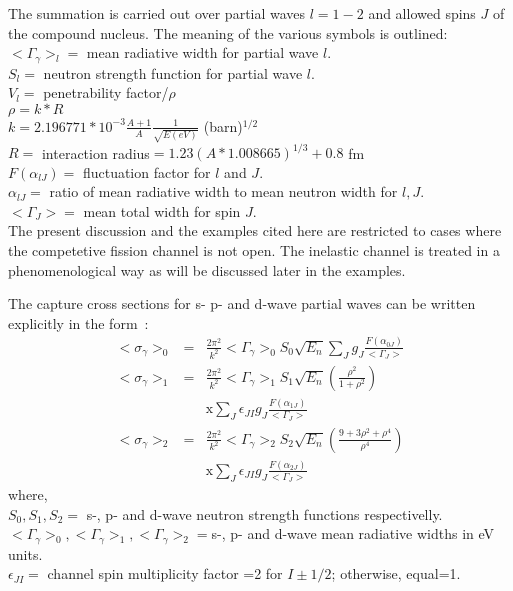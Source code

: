 \documentclass[twocolumn,amsmath,amssymb,10pt,groupedaddress,a4paper]{revtex4}
\begin{document}
    The summation is carried out over partial waves $l=1-2$ and allowed spins $J$ of the compound nucleus.
    The meaning of the various symbols is outlined:\\
$<\Gamma_{\gamma}>_l  =$ mean radiative width for partial wave $l$.\\
$S_l     =$ neutron strength function for partial wave $l$.\\
$V_l     =$ penetrability factor/$\rho$\\
$\rho     = k*R$\\
$k      = 2.196771*10^{-3}\frac{A+1}{A}\frac{1}{\sqrt{E(eV)}} $  (barn)$^{1/2}$\\
$R      =$  interaction radius$= 1.23(A*1.008665)^{1/3} +0.8  $ fm \\
$F(\alpha_{lJ})=$ fluctuation factor  for $l$ and $J$.\\
$\alpha_{lJ}  =$  ratio of mean radiative width to mean neutron width for $l,J$.\\
$<\Gamma_J > =$ mean total width for spin $J$.\\


    The present discussion  and the examples cited here are restricted to cases where the competetive
    fission channel is not open. The inelastic channel is treated
    in a phenomenological way as will be discussed later in the examples.

    The capture cross sections for s- p- and d-wave partial waves can be written explicitly in the form~\cite{lane:57}:
\begin{eqnarray}
<\sigma_\gamma>_0 & =&\frac{2\pi^2}{k^2}<\Gamma_{\gamma}>_0 S_0\sqrt{E_n}\sum_Jg_J\frac{F(\alpha_{0J})}{<\Gamma_J>}\\
<\sigma_\gamma>_1 & =&\frac{2\pi^2}{k^2}<\Gamma_{\gamma}>_1 S_1\sqrt{E_n}\left(\frac{\rho^2}{1+\rho^2}\right)\nonumber\\
&&\text{x}\sum_J\epsilon_{JI} g_J\frac{F(\alpha_{1J})}{<\Gamma_J>}\\
<\sigma_\gamma>_2 & =&\frac{2\pi^2}{k^2}<\Gamma_{\gamma}>_2 S_2\sqrt{E_n}\left(\frac{9+3\rho^2+\rho^4}{\rho^4}\right)\nonumber\\
&&\text{x}\sum_J\epsilon_{JI} g_J\frac{F(\alpha_{2J})}{<\Gamma_J>}
\end{eqnarray}
\noindent where,\\
$S_0, S_1, S_2   =$ s-, p- and d-wave neutron strength  functions respectivelly.\\
$<\Gamma_\gamma>_0, <\Gamma_\gamma>_1,  <\Gamma_\gamma>_2   = $s-, p- and d-wave mean radiative widths in eV units.\\
$\epsilon_{JI} = $ channel spin multiplicity factor =2 for $I \pm 1/2$; otherwise, equal=1.\\
\end{document}
